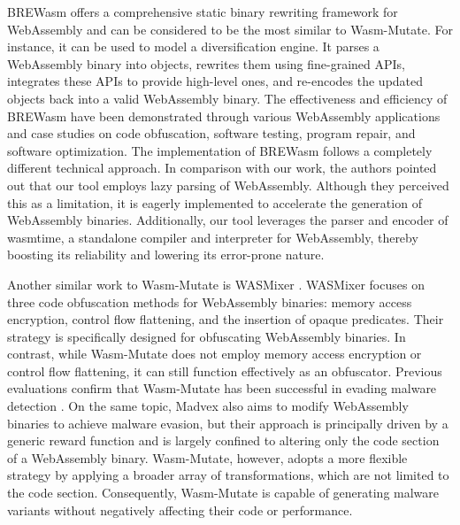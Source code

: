 \documentclass[a4paper,fleqn]{cas-dc}
\newcommand*\badge[1]{ \colorbox{red}{\color{white}#1}}
\newcommand{\tool}{{\sc Wasm-Mutate}\xspace}
\newcommand{\Wasm}{WebAssembly\xspace}
\newcommand{\wasm}{\Wasm}
\newcommand{\todo}[1]{%
\refstepcounter{todo}
\noindent\textbf{\badge{TODO}} {\color{red}#1}
\addcontentsline{td}{todo}
{\color{red}\thesection.\thetodo\xspace #1}}
\begin{document}

BREWasm \cite{rewritingtool2023} offers a comprehensive static binary rewriting framework for \Wasm and can be considered to be the most similar to \tool. 
For instance, it can be used to model a diversification engine.
It parses a WebAssembly binary into objects, rewrites them using fine-grained APIs, integrates these APIs to provide high-level ones, and re-encodes the updated objects back into a valid WebAssembly binary. 
The effectiveness and efficiency of BREWasm have been demonstrated through various WebAssembly applications and case studies on code obfuscation, software testing, program repair, and software optimization. 
The implementation of BREWasm follows a completely different technical approach.
In comparison with our work, the authors pointed out that our tool employs lazy parsing of WebAssembly. 
Although they perceived this as a limitation, it is eagerly implemented to accelerate the generation of \wasm binaries.
Additionally, our tool leverages the parser and encoder of wasmtime, a standalone compiler and interpreter for WebAssembly, thereby boosting its reliability and lowering its error-prone nature.

Another similar work to \tool is WASMixer \cite{wasmixer}.
WASMixer focuses on three code obfuscation methods for WebAssembly binaries: memory access encryption, control flow flattening, and the insertion of opaque predicates. 
Their strategy is specifically designed for obfuscating WebAssembly binaries. 
In contrast, while \tool does not employ memory access encryption or control flow flattening, it can still function effectively as an obfuscator. 
Previous evaluations confirm that \tool has been successful in evading malware detection \cite{CABRERAARTEAGA2023103296}.
On the same topic, Madvex \cite{madvex} also aims to modify WebAssembly binaries to achieve malware evasion, but their approach is principally driven by a generic reward function and is largely confined to altering only the code section of a WebAssembly binary. 
\tool, however, adopts a more flexible strategy by applying a broader array of transformations, which are not limited to the code section. 
Consequently, \tool is capable of generating malware variants without negatively affecting their code or performance.
\end{document}
